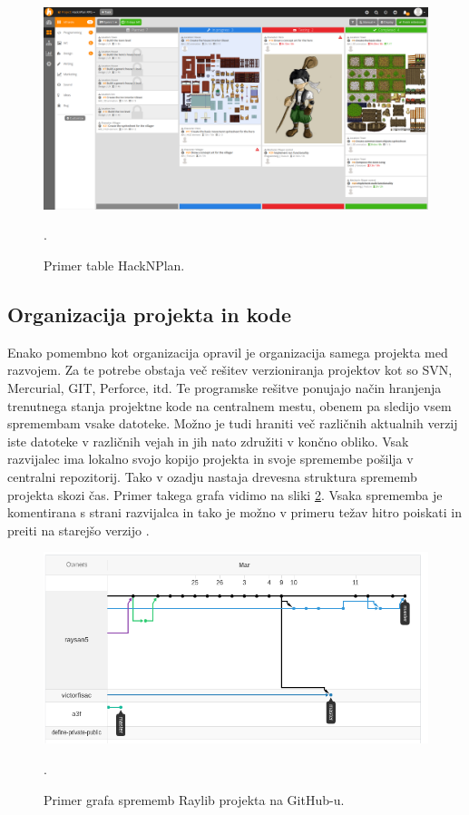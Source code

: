 \documentclass[12pt,a4paper,twoside]{book}
\begin{document}
\begin{figure}[h]
	\centering
	\includegraphics[width=13cm]{hacknplanDemo}
	\caption{Primer table HackNPlan.}.
	\label{slika:hacknplanDemo}
	\vspace*{-2em}
\end{figure}

\subsection{Organizacija projekta in kode}
Enako pomembno kot organizacija opravil je organizacija samega projekta med razvojem. Za te potrebe obstaja več rešitev verzioniranja projektov kot so SVN, Mercurial, GIT, Perforce, itd. Te programske rešitve ponujajo način hranjenja trenutnega stanja projektne kode na centralnem mestu, obenem pa sledijo vsem spremembam vsake datoteke. Možno je tudi hraniti več različnih aktualnih verzij iste datoteke v različnih vejah in jih nato združiti v končno obliko. Vsak razvijalec ima lokalno svojo kopijo projekta in svoje spremembe pošilja v centralni repozitorij. Tako v ozadju nastaja drevesna struktura sprememb projekta skozi čas. Primer takega grafa vidimo na sliki \ref{slika:gitGraph}. Vsaka sprememba je komentirana s strani razvijalca in tako je možno v primeru težav hitro poiskati in preiti na starejšo verzijo \cite{versionControl}.
	
\begin{figure}[h]
	\centering
	\includegraphics[width=13cm]{gitGraph}
	\caption{Primer grafa sprememb Raylib projekta na GitHub-u.}.
	\label{slika:gitGraph}
	\vspace*{-2em}
\end{figure}
\end{document}
